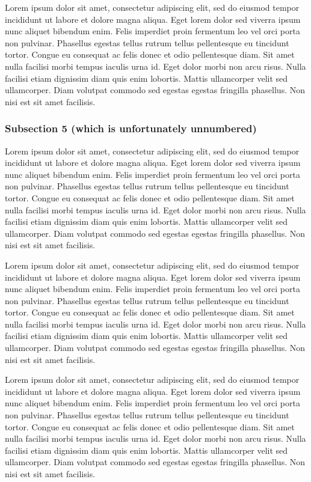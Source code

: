 \documentclass[
]{article}
\begin{document}
Lorem ipsum dolor sit amet, consectetur adipiscing elit, sed do eiusmod
tempor incididunt ut labore et dolore magna aliqua. Eget lorem dolor sed
viverra ipsum nunc aliquet bibendum enim. Felis imperdiet proin
fermentum leo vel orci porta non pulvinar. Phasellus egestas tellus
rutrum tellus pellentesque eu tincidunt tortor. Congue eu consequat ac
felis donec et odio pellentesque diam. Sit amet nulla facilisi morbi
tempus iaculis urna id. Eget dolor morbi non arcu risus. Nulla facilisi
etiam dignissim diam quis enim lobortis. Mattis ullamcorper velit sed
ullamcorper. Diam volutpat commodo sed egestas egestas fringilla
phasellus. Non nisi est sit amet facilisis.

\subsubsection*{Subsection 5 (which is unfortunately
unnumbered)}\label{subsection-5-which-is-unfortunately-unnumbered}

Lorem ipsum dolor sit amet, consectetur adipiscing elit, sed do eiusmod
tempor incididunt ut labore et dolore magna aliqua. Eget lorem dolor sed
viverra ipsum nunc aliquet bibendum enim. Felis imperdiet proin
fermentum leo vel orci porta non pulvinar. Phasellus egestas tellus
rutrum tellus pellentesque eu tincidunt tortor. Congue eu consequat ac
felis donec et odio pellentesque diam. Sit amet nulla facilisi morbi
tempus iaculis urna id. Eget dolor morbi non arcu risus. Nulla facilisi
etiam dignissim diam quis enim lobortis. Mattis ullamcorper velit sed
ullamcorper. Diam volutpat commodo sed egestas egestas fringilla
phasellus. Non nisi est sit amet facilisis.

Lorem ipsum dolor sit amet, consectetur adipiscing elit, sed do eiusmod
tempor incididunt ut labore et dolore magna aliqua. Eget lorem dolor sed
viverra ipsum nunc aliquet bibendum enim. Felis imperdiet proin
fermentum leo vel orci porta non pulvinar. Phasellus egestas tellus
rutrum tellus pellentesque eu tincidunt tortor. Congue eu consequat ac
felis donec et odio pellentesque diam. Sit amet nulla facilisi morbi
tempus iaculis urna id. Eget dolor morbi non arcu risus. Nulla facilisi
etiam dignissim diam quis enim lobortis. Mattis ullamcorper velit sed
ullamcorper. Diam volutpat commodo sed egestas egestas fringilla
phasellus. Non nisi est sit amet facilisis.

Lorem ipsum dolor sit amet, consectetur adipiscing elit, sed do eiusmod
tempor incididunt ut labore et dolore magna aliqua. Eget lorem dolor sed
viverra ipsum nunc aliquet bibendum enim. Felis imperdiet proin
fermentum leo vel orci porta non pulvinar. Phasellus egestas tellus
rutrum tellus pellentesque eu tincidunt tortor. Congue eu consequat ac
felis donec et odio pellentesque diam. Sit amet nulla facilisi morbi
tempus iaculis urna id. Eget dolor morbi non arcu risus. Nulla facilisi
etiam dignissim diam quis enim lobortis. Mattis ullamcorper velit sed
ullamcorper. Diam volutpat commodo sed egestas egestas fringilla
phasellus. Non nisi est sit amet facilisis.
\end{document}
